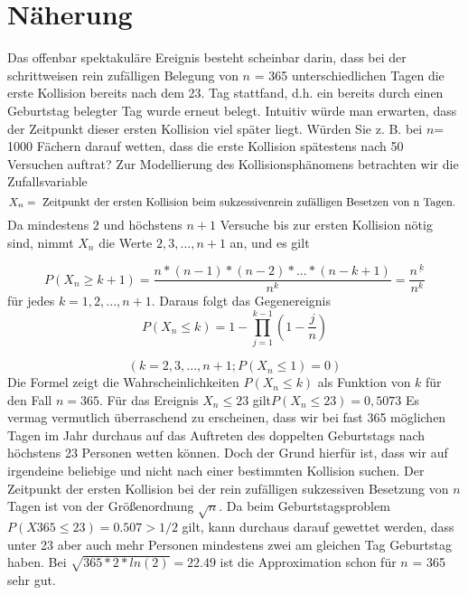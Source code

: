 \documentclass[11pt]{article}
\begin{document}
    \section{Näherung}

    Das offenbar spektakuläre Ereignis besteht scheinbar darin, dass bei der schrittweisen rein zufälligen Belegung
    von \(n\) = 365 unterschiedlichen Tagen die erste Kollision bereits nach dem 23. Tag stattfand, d.h. ein bereits
    durch einen Geburtstag belegter Tag wurde erneut belegt. Intuitiv würde man erwarten, dass der Zeitpunkt dieser
    ersten Kollision viel später liegt. Würden Sie z. B. bei \(n\)= 1000 Fächern darauf wetten, dass die erste Kollision
    spätestens nach 50 Versuchen auftrat?
    \newline
    Zur Modellierung des Kollisionsphänomens betrachten wir die Zufallsvariable
    \newline
    \[{ X_{n} = \text{ Zeitpunkt der ersten Kollision beim sukzessiven \newline rein zufälligen Besetzen von n Tagen. } }\]
    \newline
    Da mindestens \(2\) und höchstens \(n + 1\) Versuche bis zur ersten Kollision nötig sind, nimmt \(X_n\) die Werte \(2,3, . . ., n + 1\) an, und es gilt


    \[P(X_{n} \geq k+1) = \frac {n*(n-1)*(n-2)* ... * (n-k + 1)}{n^k} = \frac{n^{\underline{\ k}}}{n^k}\]
    \newline\newline
    für jedes \(k = 1,2,...,n+1\).
    \newline
    Daraus folgt das Gegenereignis
    \newline\newline
    \[P(X_{n} \leq k) = 1-\prod \limits_{j=1}^{k-1}(1- \frac{j}{n})\]

    \[(k=2,3,...,n+1; P(X_n\leq1) = 0)\]
    \newline
    Die Formel zeigt die Wahrscheinlichkeiten \(P(X_{n} \leq k)\) als Funktion von \(k\) für den Fall \(n = 365\).
    Für das Ereignis \({X_{n} \leq 23}\) gilt\( P(X_{n} \leq 23) = 0,5073 \)
    \newline
    \newline
    Es vermag vermutlich überraschend zu erscheinen, dass wir bei fast 365 möglichen Tagen im Jahr durchaus auf das
    Auftreten des doppelten Geburtstags nach höchstens 23 Personen wetten können. Doch der Grund hierfür ist, dass wir
    auf irgendeine beliebige und nicht nach einer bestimmten Kollision suchen.
    Der Zeitpunkt der ersten Kollision bei der rein zufälligen sukzessiven Besetzung von \(n\) Tagen ist von
    der Größenordnung \(\sqrt{n}\).
    \newline
    \newline
    Da beim Geburtstagsproblem  \(P (X365 \leq 23) = 0.507 > 1/2\) gilt, kann durchaus darauf gewettet werden,
    dass unter 23 aber auch mehr Personen mindestens zwei am gleichen Tag Geburtstag haben. Bei
    \(\sqrt{365 * 2 * ln(2)} = 22.49\)
    ist die Approximation schon für \(n\) = 365 sehr gut.
\end{document}
